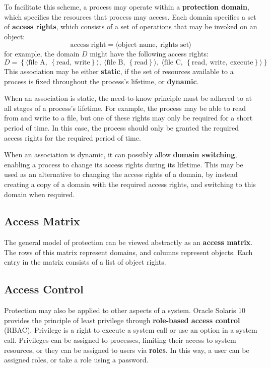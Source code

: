 \documentclass{article}
\begin{document}
To facilitate this scheme, a process may operate within a
\textbf{protection domain}, which specifies the resources that process
may access. Each domain specifies a set of \textbf{access rights}, which
consists of a set of operations that may be invoked on an object:
\begin{equation*}
    \text{access right} = \langle \text{object name},\: \text{rights set} \rangle
\end{equation*}
for example, the domain \(D\) might have the following access rights:
\begin{equation*}
    D = \left\{
        \langle \text{file A},\: \left\{ \text{read},\: \text{write} \right\} \rangle,\:
        \langle \text{file B},\: \left\{ \text{read} \right\} \rangle,\:
        \langle \text{file C},\: \left\{ \text{read},\: \text{write},\: \text{execute} \right\} \rangle
     \right\}
\end{equation*}
This association may be either \textbf{static}, if the set of resources
available to a process is fixed throughout the process's lifetime, or
\textbf{dynamic}.

When an association is static, the need-to-know principle must be adhered
to at all stages of a process's lifetime. For example, the process may
be able to read from and write to a file, but one of these rights may
only be required for a short period of time. In this case, the process
should only be granted the required access rights for the required
period of time.

When an association is dynamic, it can possibly allow \textbf{domain
switching}, enabling a process to change its access rights during its
lifetime. This may be used as an alternative to changing the access
rights of a domain, by instead creating a copy of a domain with the
required access rights, and switching to this domain when required.
\subsection{Access Matrix}
The general model of protection can be viewed abstractly as an
\textbf{access matrix}. The rows of this matrix represent domains,
and columns represent objects. Each entry in the matrix consists of a
list of object rights.
\subsection{Access Control}
Protection may also be applied to other aspects of a system. Oracle
Solaris 10 provides the principle of least privilege through
\textbf{role-based access control} (RBAC). Privilege is a right to
execute a system call or use an option in a system call. Privileges can
be assigned to processes, limiting their access to system resources, or
they can be assigned to users via \textbf{roles}. In this way, a user
can be assigned roles, or take a role using a password.
\end{document}

